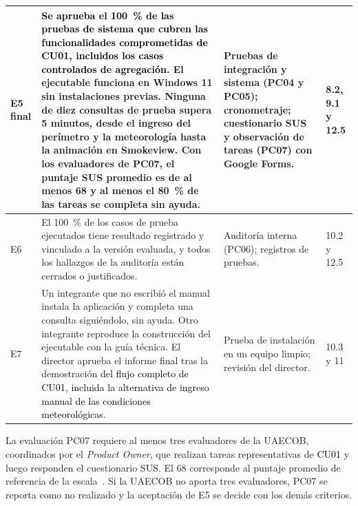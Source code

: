 \begin{longtable}{|p{}|p{}|p{}|p{}|}
\raggedright E5 final & \raggedright \textcolor{black}{Se aprueba el 100~\% de las pruebas de sistema que cubren las funcionalidades comprometidas de CU01, incluidos los casos controlados de agregación.} El ejecutable funciona en Windows 11 sin instalaciones previas. Ninguna de diez consultas de prueba supera 5 minutos, desde el ingreso del perímetro y la meteorología hasta la animación en Smokeview. Con los evaluadores de PC07, el puntaje SUS promedio es de al menos 68 y al menos el 80~\% de las tareas se completa sin ayuda. & \raggedright Pruebas de integración y sistema (PC04 y PC05); cronometraje; cuestionario SUS~\cite{brooke1996sus,lewis2018sus} y observación de tareas (PC07) con Google Forms. & \raggedright 8.2, 9.1 y 12.5\tabularnewline\hline
E6 & \raggedright El 100~\% de los casos de prueba ejecutados tiene resultado registrado y vinculado a la versión evaluada, y todos los hallazgos de la auditoría están cerrados o justificados. & \raggedright Auditoría interna (PC06); registros de pruebas. & \raggedright 10.2 y 12.5\tabularnewline\hline
E7 & \raggedright Un integrante que no escribió el manual instala la aplicación y completa una consulta siguiéndolo, sin ayuda. Otro integrante reproduce la construcción del ejecutable con la guía técnica. El director aprueba el informe final tras la demostración \textcolor{black}{del flujo completo de CU01, incluida la alternativa de ingreso manual de las condiciones meteorológicas}. & \raggedright Prueba de instalación en un equipo limpio; revisión del director. & \raggedright 10.3 y 11\tabularnewline\hline
\end{longtable}
 
La evaluación PC07 requiere al menos tres evaluadores de la UAECOB, coordinados por el \textit{Product Owner}, que realizan tareas representativas de \textcolor{black}{CU01} y luego responden el cuestionario SUS. El 68 corresponde al puntaje promedio de referencia de la escala~\cite{lewis2018sus}. Si la UAECOB no aporta tres evaluadores, PC07 se reporta como no realizado y la aceptación de E5 se decide con los demás criterios.
 